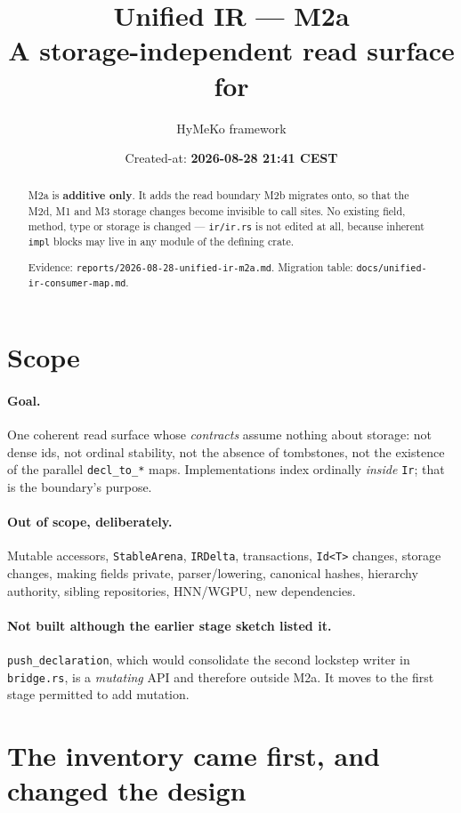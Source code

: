 \documentclass[11pt,a4paper]{article}
\title{Unified IR --- M2a\\[2pt]
       \large A storage-independent read surface for \code{hymeko\_core::ir::Ir}}
\author{HyMeKo framework}
\date{Created-at: \textbf{2026-08-28 21:41 CEST}}
\newcommand{\code}[1]{\texttt{#1}}
\begin{document}
\maketitle

\begin{abstract}
\noindent
M2a is \textbf{additive only}. It adds the read boundary M2b migrates onto, so
that the M2d, M1 and M3 storage changes become invisible to call sites. No
existing field, method, type or storage is changed --- \code{ir/ir.rs} is not
edited at all, because inherent \code{impl} blocks may live in any module of the
defining crate.

\medskip
\noindent
Evidence: \code{reports/2026-08-28-unified-ir-m2a.md}. Migration table:
\code{docs/unified-ir-consumer-map.md}.
\end{abstract}

\section{Scope}

\paragraph{Goal.} One coherent read surface whose \emph{contracts} assume
nothing about storage: not dense ids, not ordinal stability, not the absence of
tombstones, not the existence of the parallel \code{decl\_to\_*} maps.
Implementations index ordinally \emph{inside} \code{Ir}; that is the boundary's
purpose.

\paragraph{Out of scope, deliberately.} Mutable accessors, \code{StableArena},
\code{IRDelta}, transactions, \code{Id<T>} changes, storage changes, making
fields private, parser/lowering, canonical hashes, hierarchy authority, sibling
repositories, HNN/WGPU, new dependencies.

\paragraph{Not built although the earlier stage sketch listed it.}
\code{push\_declaration}, which would consolidate the second lockstep writer in
\code{bridge.rs}, is a \emph{mutating} API and therefore outside M2a. It moves to
the first stage permitted to add mutation.

\section{The inventory came first, and changed the design}
\end{document}
